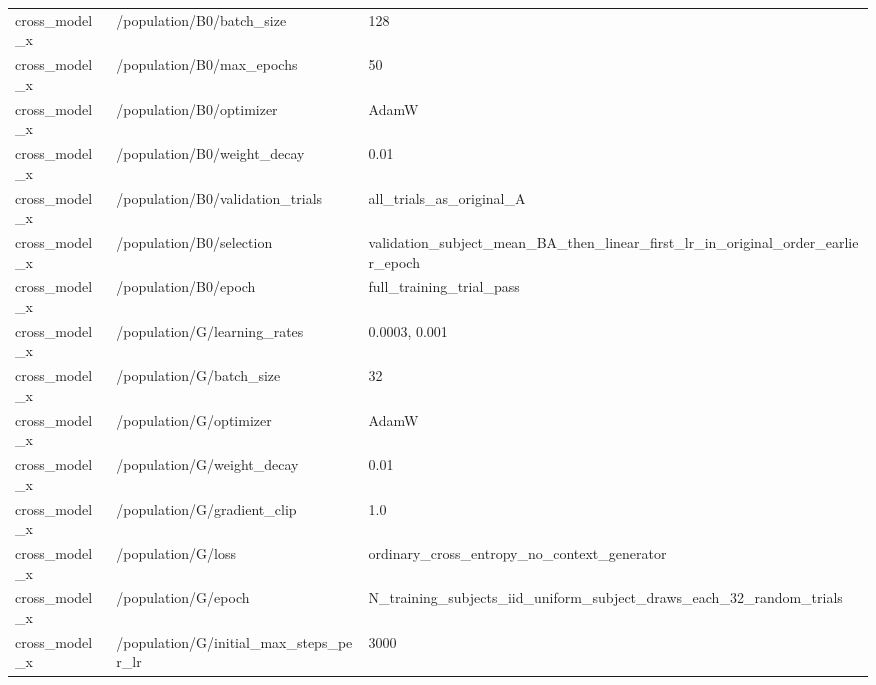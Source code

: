 \begin{longtable}{p{.65in}p{2.8in}p{3.2in}}
cross\_\allowbreak{}model\_\allowbreak{}x & /population/B0/batch\_\allowbreak{}size & 128 \\
cross\_\allowbreak{}model\_\allowbreak{}x & /population/B0/max\_\allowbreak{}epochs & 50 \\
cross\_\allowbreak{}model\_\allowbreak{}x & /population/B0/optimizer & AdamW \\
cross\_\allowbreak{}model\_\allowbreak{}x & /population/B0/weight\_\allowbreak{}decay & 0.01 \\
cross\_\allowbreak{}model\_\allowbreak{}x & /population/B0/validation\_\allowbreak{}trials & all\_\allowbreak{}trials\_\allowbreak{}as\_\allowbreak{}original\_\allowbreak{}A \\
cross\_\allowbreak{}model\_\allowbreak{}x & /population/B0/selection & validation\_\allowbreak{}subject\_\allowbreak{}mean\_\allowbreak{}BA\_\allowbreak{}then\_\allowbreak{}linear\_\allowbreak{}first\_\allowbreak{}lr\_\allowbreak{}in\_\allowbreak{}original\_\allowbreak{}order\_\allowbreak{}earlier\_\allowbreak{}epoch \\
cross\_\allowbreak{}model\_\allowbreak{}x & /population/B0/epoch & full\_\allowbreak{}training\_\allowbreak{}trial\_\allowbreak{}pass \\
cross\_\allowbreak{}model\_\allowbreak{}x & /population/G/learning\_\allowbreak{}rates & 0.0003, 0.001 \\
cross\_\allowbreak{}model\_\allowbreak{}x & /population/G/batch\_\allowbreak{}size & 32 \\
cross\_\allowbreak{}model\_\allowbreak{}x & /population/G/optimizer & AdamW \\
cross\_\allowbreak{}model\_\allowbreak{}x & /population/G/weight\_\allowbreak{}decay & 0.01 \\
cross\_\allowbreak{}model\_\allowbreak{}x & /population/G/gradient\_\allowbreak{}clip & 1.0 \\
cross\_\allowbreak{}model\_\allowbreak{}x & /population/G/loss & ordinary\_\allowbreak{}cross\_\allowbreak{}entropy\_\allowbreak{}no\_\allowbreak{}context\_\allowbreak{}generator \\
cross\_\allowbreak{}model\_\allowbreak{}x & /population/G/epoch & N\_\allowbreak{}training\_\allowbreak{}subjects\_\allowbreak{}iid\_\allowbreak{}uniform\_\allowbreak{}subject\_\allowbreak{}draws\_\allowbreak{}each\_\allowbreak{}32\_\allowbreak{}random\_\allowbreak{}trials \\
cross\_\allowbreak{}model\_\allowbreak{}x & /population/G/initial\_\allowbreak{}max\_\allowbreak{}steps\_\allowbreak{}per\_\allowbreak{}lr & 3000 \\

\end{longtable}
